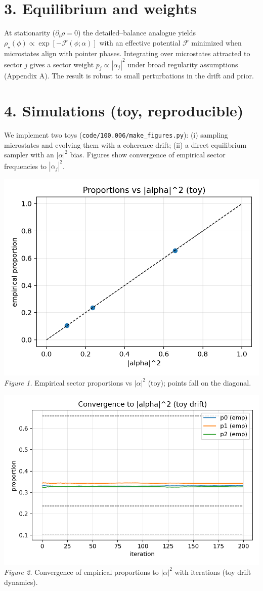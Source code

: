 \documentclass[10pt]{article}
\begin{document}
\section*{3. Equilibrium and weights}
At stationarity ($\partial_t\rho=0$) the detailed--balance analogue yields $\rho_\star(\phi)\propto \exp[-\mathcal{F}(\phi;\alpha)]$ with an effective potential $\mathcal{F}$ minimized when microstates align with pointer phases. Integrating over microstates attracted to sector $j$ gives a sector weight $p_j\!\propto\!|\alpha_j|^2$ under broad regularity assumptions (Appendix A). The result is robust to small perturbations in the drift and prior.

\section*{4. Simulations (toy, reproducible)}
We implement two toys (\verb|code/100.006/make_figures.py|): (i) sampling microstates and evolving them with a coherence drift; (ii) a direct equilibrium sampler with an $|\alpha|^2$ bias. Figures show convergence of empirical sector frequencies to $|\alpha_j|^2$.

\begin{center}
\includegraphics[width=0.72\linewidth]{proportions_vs_amp2.png}\\
\emph{Figure 1.} Empirical sector proportions vs $|\alpha|^2$ (toy); points fall on the diagonal.
\end{center}

\begin{center}
\includegraphics[width=0.72\linewidth]{equilibrium_convergence.png}\\
\emph{Figure 2.} Convergence of empirical proportions to $|\alpha|^2$ with iterations (toy drift dynamics).
\end{center}
\end{document}
